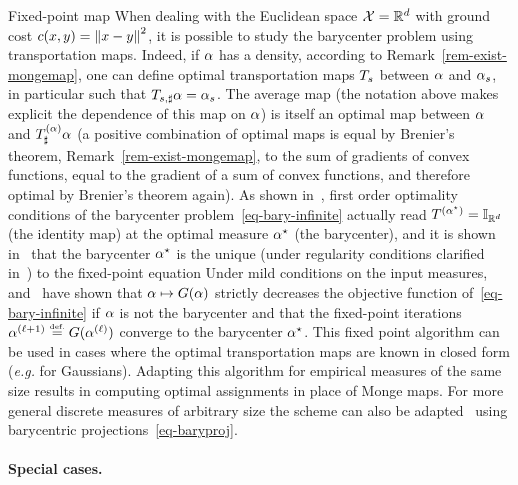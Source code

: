 \begin{rem2}{Fixed-point map}
When dealing with the Euclidean space $\mathcal{X}=\mathbb{R}^d$ with ground cost $c(x,y)=\left\| x-y \right\|^2$, it is possible to study the barycenter problem using transportation maps. Indeed, if $\alpha$ has a density, according to Remark~\ref{rem-exist-mongemap}, one can define optimal transportation maps $T_s$ between $\alpha$ and $\alpha_s$, in particular such that $T_{s,\sharp}\alpha = \alpha_s$. The average map 
(the notation above makes explicit the dependence of this map on $\alpha$) is itself an optimal map between $\alpha$ and $T^{(\alpha)}_\sharp \alpha$ (a positive combination of optimal maps is equal by Brenier's theorem, Remark~\ref{rem-exist-mongemap}, to the sum of gradients of convex functions, equal to the gradient of a sum of convex functions, and therefore optimal by Brenier's theorem again). 
As shown in~\citep{Carlier_wasserstein_barycenter}, first order optimality conditions of the barycenter problem~\eqref{eq-bary-infinite} actually read $T^{(\alpha^\star)}=\mathbb{I}_{\mathbb{R}^d}$ (the identity map) at the optimal measure $\alpha^\star$ (the barycenter), and it is shown in~\citep{alvarez2016fixed} that the barycenter $\alpha^\star$ is the unique (under regularity conditions clarified in~\citep[Theo. 2]{zemel2017fr}) to the fixed-point equation 
Under mild conditions on the input measures,~\citet{alvarez2016fixed} and~\citet{zemel2017fr} have shown that $\alpha \mapsto G(\alpha)$ strictly decreases the objective function of~\eqref{eq-bary-infinite} if $\alpha$ is not the barycenter and that the fixed-point iterations $\itt{\al} \eqdef G( \it{\al} )$ converge to the barycenter $\alpha^\star$. 
%
This fixed point algorithm can be used in cases where the optimal transportation maps are known in closed form (\emph{e.g.} for Gaussians). Adapting this algorithm for empirical measures of the same size results in computing optimal assignments in place of Monge maps. For more general discrete measures of arbitrary size the scheme can also be adapted~\citep{CuturiBarycenter} using barycentric projections~\eqref{eq-baryproj}.
\end{rem2}



\paragraph{Special cases.}


